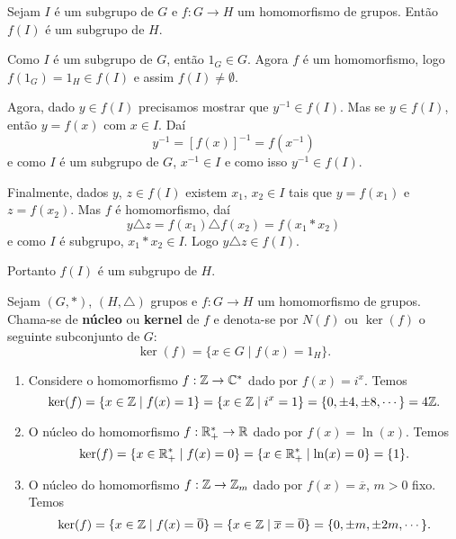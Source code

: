 \begin{proposicao}
    Sejam $I$ é um subgrupo de $G$ e $f : G \to H$ um homomorfismo de grupos. Então $f(I)$ é um subgrupo de $H$.
\end{proposicao}
\begin{prova}
    Como $I$ é um subgrupo de $G$, então $1_G \in G$. Agora $f$ é um homomorfismo, logo $f(1_G) = 1_H \in f(I)$ e assim $f(I) \ne \emptyset$.

    Agora, dado $y \in f(I)$ precisamos mostrar que $y^{-1} \in f(I)$. Mas se $y \in f(I)$, então $y = f(x)$ com $x \in I$. Daí
    \[
        y^{-1} = [f(x)]^{-1} = f(x^{-1})
    \]
    e como $I$ é um subgrupo de $G$, $x^{-1} \in I$ e como isso $y^{-1} \in f(I)$.

    Finalmente, dados $y$, $z \in f(I)$ existem $x_1$, $x_2 \in I$ tais que $y = f(x_1)$ e $z = f(x_2)$. Mas $f$ é homomorfismo, daí
    \[
        y\triangle z = f(x_1)\triangle f(x_2) = f(x_1*x_2)
    \]
    e como $I$ é subgrupo, $x_1*x_2 \in I$. Logo $y\triangle z \in f(I)$.

    Portanto $f(I)$ é um subgrupo de $H$.
\end{prova}

\begin{definicao}
    Sejam $(G, *)$, $(H, \triangle)$ grupos e $f : G \to H$ um homomorfismo de grupos. Chama-se de \textbf{n\'ucleo} ou \textbf{kernel} de $f$ e denota-se por $N(f)$ ou $\ker(f)$ o seguinte subconjunto de $G$:
    \[
        \ker(f) = \{x \in G \mid f(x) = 1_H\}.
    \]
\end{definicao}

\begin{exemplos}
    \begin{enumerate}[label={\roman*})]
        \item Considere o homomorfismo $f : \mathbb{Z} \to \mathbb{C}^*$ dado por $f(x) = i^x$. Temos
        \[
            \ker(f) = \{x \in \mathbb{Z} \mid f(x) = 1\} = \{x \in \mathbb{Z} \mid i^x = 1\} = \{0, \pm 4, \pm 8, \cdots\} = 4\mathbb{Z}.
        \]

        \item O n\'ucleo do homomorfismo $f : \mathbb{R}^*_+ \to \mathbb{R}$ dado por $f(x) = \ln(x)$. Temos
        \[
            \ker(f) = \{x \in \mathbb{R}^*_+ \mid f(x) = 0\} = \{x \in \mathbb{R}^*_+ \mid \ln(x) = 0\} = \{1\}.
        \]

        \item O n\'ucleo do homomorfismo $f : \mathbb{Z} \to \mathbb{Z}_m$ dado por $f(x) = \overline{x}$, $m > 0$ fixo. Temos
        \[
            \ker(f) = \{x \in \mathbb{Z} \mid f(x) = \overline{0}\} = \{x \in \mathbb{Z} \mid \overline{x} = \overline{0}\} = \{0, \pm m, \pm 2m, \cdots\}.
        \]
    \end{enumerate}
\end{exemplos}


